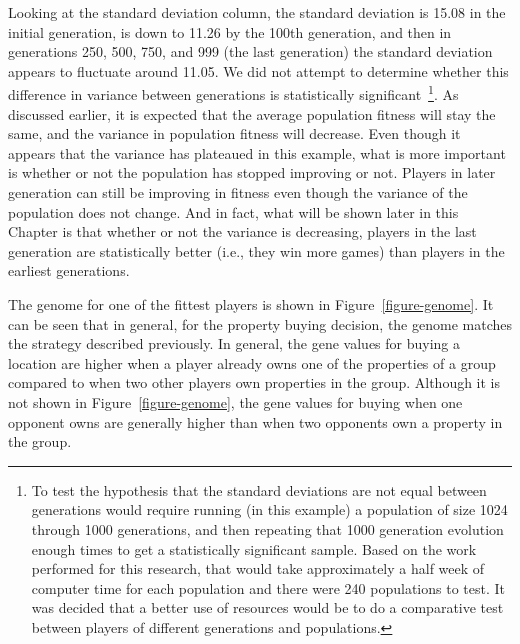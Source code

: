 Looking at the standard deviation column, the standard deviation is 15.08 in the
initial generation, is down to 11.26 by the 100th generation, and then in
generations 250, 500, 750, and 999 (the last generation) the standard deviation
appears to fluctuate around 11.05. We did not attempt to determine whether this
difference in variance between generations is statistically
significant~\footnote{To test the hypothesis that the standard deviations are
not equal between generations would require running (in this example) a
population of size 1024 through 1000 generations, and then repeating that 1000
generation evolution enough times to get a statistically significant sample.
Based on the work performed for this research, that would take approximately a
half week of computer time for each population and there were 240 populations to
test. It was decided that a better use of resources would be to do a comparative
test between players of different generations and populations.}. As discussed
earlier, it is expected that the average population fitness will stay the same,
and the variance in population fitness will decrease. Even though it appears
that the variance has plateaued in this example, what is more important is
whether or not the population has stopped improving or not. Players in later
generation can still be improving in fitness even though the variance of the
population does not change. And in fact, what will be shown later in this
Chapter is that whether or not the variance is decreasing, players in the last
generation are statistically better (i.e., they win more games) than players in
the earliest generations.

The genome for one of the fittest players is shown in
Figure~\ref{figure-genome}. It can be seen that in general, for the property
buying decision, the genome matches the strategy described previously. In
general, the gene values for buying a location are higher when a player already
owns one of the properties of a group compared to when two other players own
properties in the group. Although it is not shown in Figure~\ref{figure-genome},
the gene values for buying when one opponent owns are generally higher than when
two opponents own a property in the group.

